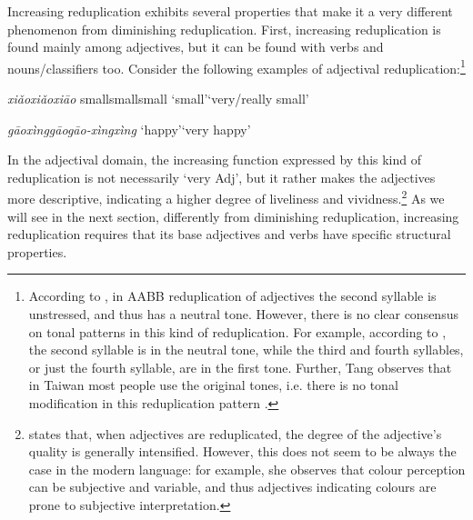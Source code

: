 \documentclass[output=paper]{langsci/langscibook}
\begin{document}
Increasing reduplication exhibits several properties that make it a very
different phenomenon from diminishing reduplication. First, increasing
reduplication is found mainly among adjectives, but it can be found with
verbs and nouns/classifiers too. Consider the following examples of
adjectival reduplication:\footnote{According
  to %
\citet[33]{Li1981}%
%
, in AABB reduplication of adjectives the
  second syllable is unstressed, and thus has a neutral tone. However,
  there is no clear consensus on tonal patterns in this kind of
  reduplication. For example, according to %
\citet[282]{Tang88}%
%
, the second
  syllable is in the neutral tone, while the third and fourth syllables,
  or just the fourth syllable, are in the first tone. Further, Tang
  observes that in Taiwan most people use the original tones,
  i.e. there is no tonal modification in this reduplication pattern %
\citep[see   also the examples in][]{Paul2010a}%
%
.}

\ea\label{ex:BascianoMelloni:6}

  \ea\label{ex:BascianoMelloni:6a}%
          {\emph{xiǎo}}{\emph{xiǎo\tld{}xiāo}}%
          {small}{small\tld{}small}%
          {`small'}{`very/really small'}%

  \ex\label{ex:BascianoMelloni:6b}%
        {\emph{gāoxìng}}{\emph{gāo\tld{}gāo-xìng\tld{}xìng{}}}%
        {`happy'}{`very happy'}%

  \z

\z

In the adjectival domain, the increasing function expressed by this kind
of reduplication is not necessarily `very Adj', but it rather makes the
adjectives more descriptive, indicating a higher degree of liveliness
and vividness.\footnote{%
\citet[6]{Xu2012a} %
%
states that, when adjectives are
  reduplicated, the degree of the adjective's quality is generally
  intensified. However, this does not seem to be always the case in the
  modern language: for example, she observes that colour perception can
  be subjective and variable, and thus adjectives indicating colours are
  prone to subjective interpretation.} As we will see in the next
section, differently from diminishing reduplication, increasing
reduplication requires that its base adjectives and verbs have specific
structural properties.
\end{document}
